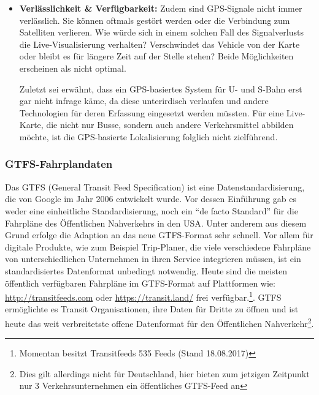 \begin{itemize}[label={}]
      \item \textbf{Verlässlichkeit \& Verfügbarkeit:} 
        Zudem sind GPS-Signale nicht immer verlässlich. Sie können oftmals gestört werden oder die Verbindung zum Satelliten verlieren. Wie würde sich in einem solchen Fall des Signalverlusts die Live-Visualisierung verhalten? Verschwindet das Vehicle von der Karte oder bleibt es für längere Zeit auf der Stelle stehen? Beide Möglichkeiten erscheinen als nicht optimal. 

        Zuletzt sei erwähnt, dass ein GPS-basiertes System für U- und S-Bahn erst gar nicht infrage käme, da diese unterirdisch verlaufen und andere Technologien für deren Erfassung eingesetzt werden müssten. Für eine Live-Karte, die nicht nur Busse, sondern auch andere Verkehrsmittel abbilden möchte, ist die GPS-basierte Lokalisierung folglich nicht zielführend. 

    \end{itemize} 


    \subsubsection{GTFS-Fahrplandaten}
    \label{ssub:gtfs_fahrplandaten}
      Das GTFS (General Transit Feed Specification) ist eine Datenstandardisierung, die von Google im Jahr 2006 entwickelt wurde. Vor dessen Einführung gab es weder eine einheitliche Standardisierung, noch ein "`de facto Standard"' für die Fahrpläne des Öffentlichen Nahverkehrs in den USA. Unter anderem aus diesem Grund erfolge die Adaption an das neue GTFS-Format sehr schnell. Vor allem für digitale Produkte, wie zum Beispiel Trip-Planer, die viele verschiedene Fahrpläne von unterschiedlichen Unternehmen in ihren Service integrieren müssen, ist ein standardisiertes Datenformat unbedingt notwendig. Heute sind die meisten öffentlich verfügbaren Fahrpläne im GTFS-Format auf Plattformen wie: \url{http://transitfeeds.com} oder \url{https://transit.land/} frei verfügbar.\footnote{Momentan besitzt Transitfeeds 535 Feeds (Stand 18.08.2017)}. GTFS ermöglichte es Transit Organisationen, ihre Daten für Dritte zu öffnen und ist heute das weit verbreitetste offene Datenformat für den Öffentlichen Nahverkehr\footnote{Dies gilt allerdings nicht für Deutschland, hier bieten zum jetzigen Zeitpunkt nur 3 Verkehrsunternehmen ein öffentliches GTFS-Feed an}.\parencite[S. 2]{roush}\\

